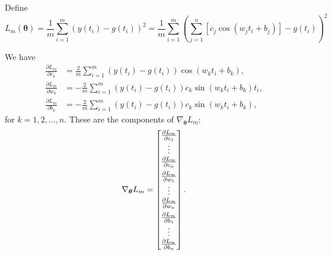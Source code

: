 \documentclass{homework}
\begin{document}
	\question 
	\newcommand{\btheta}{\boldsymbol{\theta}}
	Define
	\begin{equation*}
		L_m(\btheta) = \frac{1}{m}\sum_{i=1}^m(y(t_i) -g(t_i))^2 = \frac{1}{m}\sum_{i=1}^m\left(\sum_{j=1}^n\left[c_j\cos(w_jt_i + b_j)\right] -g(t_i)\right)^2
	\end{equation*}
	\begin{alphaparts}
		\questionpart We have
		\begin{align*}
			\frac{\partial L_m}{\partial c_k} &= \frac{2}{m}\sum_{i=1}^m\left(y(t_i) - g(t_i)\right)\cos(w_kt_i + b_k), \\
			\frac{\partial L_m}{\partial w_k} &= -\frac{2}{m}\sum_{i=1}^m\left(y(t_i)- g(t_i)\right)c_k\sin(w_kt_i + b_k)t_i, \\
			\frac{\partial L_m}{\partial b_k} &= -\frac{2}{m}\sum_{i=1}^m\left(y(t_i) - g(t_i)\right)c_k\sin(w_kt_i+b_k),
		\end{align*}
		for $k = 1,2,\dots, n$. These are the components of $\nabla_{\btheta} L_m$:
		\begin{equation*}
			\nabla_{\btheta}L_m = \mat{\frac{\partial L_m}{\partial c_1} \\ \vdots \\ \frac{\partial L_m}{\partial c_n} \\[0.5em] \frac{\partial L_m}{\partial w_1} \\ \vdots \\ \frac{\partial L_m}{\partial w_n} \\[0.5em] \frac{\partial L_m}{\partial b_1} \\ \vdots \\ \frac{\partial L_m}{\partial b_n}}.
		\end{equation*}
		

\end{alphaparts}
\end{document}
